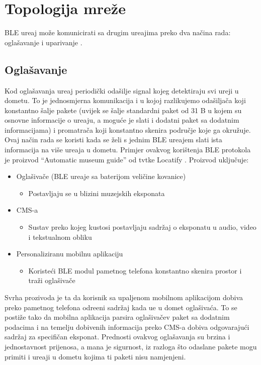 \section{Topologija mre\v{z}e}

BLE ure\dj aj mo\v{z}e komunicirati sa drugim ure\dj ajima preko dva na\v{c}ina rada: ogla\v{s}avanje i uparivanje \cite{ble_getting_started}.

\subsection{Ogla\v{s}avanje}

Kod ogla\v{s}avanja ure\dj aj periodi\v{c}ki oda\v{s}ilje signal kojeg detektiraju svi ure\dj ji u dometu. To je jednosmjerna komunikacija i u kojoj razlikujemo oda\v{s}ilja\v{c}a koji konstantno \v{s}alje pakete (uvijek se \v{s}alje standardni paket od 31 B u kojem su osnovne informacije o ure\dj aju, a mogu\'{c}e je slati i dodatni paket sa dodatnim informacijama) i promatra\v{c}a koji konstantno skenira podru\v{c}je koje ga okru\v{z}uje. Ovaj na\v{c}in rada se koristi kada se \v{z}eli s jednim BLE ure\dj ajem slati ista informacija na vi\v{s}e ure\dj aja u dometu. Primjer ovakvog kori\v{s}tenja BLE protokola je proizvod ``Automatic museum guide'' od tvtke Locatify \cite{automatic_museum_guide} . Proizvod uklju\v{c}uje:


\begin{itemize}
	\item Ogla\v{s}iva\v{c}e (BLE ure\dj aje sa baterijom veli\v{c}ine kovanice)
	\begin{itemize}
		\item Postavljaju se u blizini muzejskih eksponata
	\end{itemize}
	\item CMS-a
	\begin{itemize}
		\item Sustav preko kojeg kustosi postavljaju sadr\v{z}aj o eksponatu u audio, video i tekstualnom obliku
	\end{itemize}
	
	\item Personaliziranu mobilnu aplikaciju
	\begin{itemize}
		\item Koriste\'{c}i BLE modul pametnog telefona konstantno skenira prostor i tra\v{z}i ogla\v{s}iva\v{c}e
	\end{itemize}
\end{itemize}

Svrha prozivoda je ta da korisnik sa upaljenom mobilnom aplikacijom dobiva preko pametnog telefona odre\dj eni sadr\v{z}aj kada u\dj e u domet ogla\v{s}iva\'{c}a. To se posti\v{z}e tako da mobilna aplikacija parsira ogla\v{s}iva\v{c}ev paket sa dodatnim podacima i na temelju dobivenih informacija preko CMS-a dobiva odgovaraju\'{c}i sadr\v{z}aj za specifi\v{c}an eksponat.
Prednosti ovakvog ogla\v{s}avanja su brzina i jednostavnost prijenosa, a mana je sigurnost, iz razloga \v{s}to odaslane pakete mogu primiti i ure\dj aji u dometu kojima ti paketi nisu namjenjeni.


